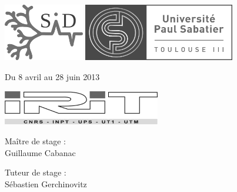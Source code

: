 \cleardoublepage
\begingroup
	\thispagestyle{empty}
	
	\begin{figure}[h!]
		\includegraphics[height=2.5cm]{img/logos/logoSidBW}\hfill
		\includegraphics[height=2.5cm]{img/logos/logoUpsBW}
	\end{figure}
	
	
	
	\begin{figure}[h!]
		\begin{minipage}[l]{0.6\textwidth}
			\par\normalfont\large\sffamily\selectfont
			Du 8 avril au 28 juin 2013
			\vspace*{5mm}
			
			\includegraphics[height=1.5cm]{img/logos/iritBW}
		\end{minipage}\hfill
		\begin{minipage}[l]{0.35\textwidth}
			\par\normalfont\large\sffamily\selectfont
			Maître de stage :\\
			Guillaume Cabanac
			\vspace*{5mm}
			
			Tuteur de stage :\\
			Sébastien Gerchinovitz
		\end{minipage}
	\end{figure}
\endgroup